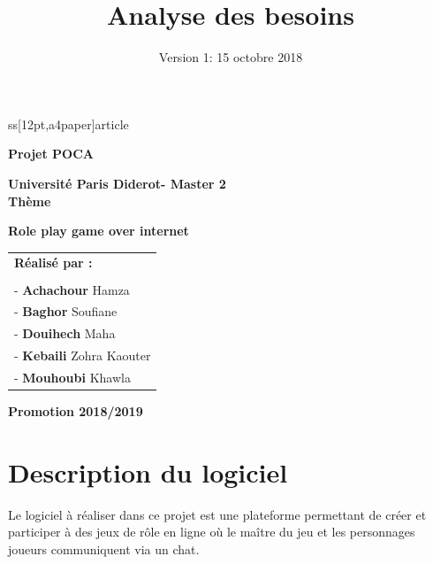 ss[12pt,a4paper]{article}
\usepackage[utf8]{inputenc}
\usepackage{natbib}
\usepackage{graphicx}
\usepackage{float}
\setcounter{secnumdepth}{5}
\setcounter{tocdepth}{4}
\usepackage{tabularx}

\usepackage{multirow}
\usepackage{framed}

\begin{center}

 \vspace*{1cm}
  \LARGE
  \textbf{Projet POCA\\}
  \large
 
   \large
  	\vspace{2cm}
  \textbf{Université Paris Diderot- Master 2}\\
  \vspace{1cm}
  \LARGE
  \textbf{Thème}\\

  \LARGE
  \setlength{\fboxsep}{0.5cm}
  \begin{framed}
	\textbf{Role play game over internet}
  \end{framed}
  \vspace{2cm}
\begin{table}[H]
   \setlength{\tabcolsep}{2cm}
    \large
	\centering
	\begin{tabular}{l}
		\textbf{Réalisé par :}    
		 \\  \\
		 -\textbf{ Achachour} Hamza\\
		-\textbf{ Baghor} Soufiane\\
	
	-\textbf{ Douihech } Maha \\
		-\textbf{ Kebaili} Zohra Kaouter \\
		-\textbf{ Mouhoubi } Khawla \\
		
  

	\end{tabular}
  \end{table}
  \vspace{\fill}
  \large
  \textbf{Promotion 2018/2019}
   \end{center}
\title{\Huge{Analyse des besoins}}

\date{Version 1: 15 octobre 2018}
\newpage




\section{Description du logiciel}
\par Le logiciel à réaliser dans ce projet est une plateforme permettant de créer et participer à des jeux de rôle en ligne où le maître du jeu et les personnages joueurs communiquent via un chat.

